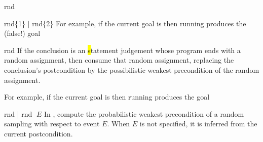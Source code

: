 \begin{tactic}{rnd}
\begin{tsyntax}{rnd\{1\} | rnd\{2\}}
    \bigskip For example, if the current goal is
     then
    running 
    produces the (false!) goal
  \end{tsyntax}

  \begin{tsyntax}{rnd}
    If the conclusion is an \hl statement judgement whose program ends
    with a random assignment, then consume that random assignment,
    replacing the conclusion's postcondition by the possibilistic
    weakest precondition of the random assignment.

    \bigskip For example, if the current goal is
     then
    running 
    produces the goal
  \end{tsyntax}

  \begin{tsyntax}{rnd | rnd $\;E$}
    In \phl, compute the probabilistic weakest precondition of a
    random sampling with respect to event $E$. When $E$ is not
    specified, it is inferred from the current postcondition.
  \end{tsyntax}
\end{tactic}
